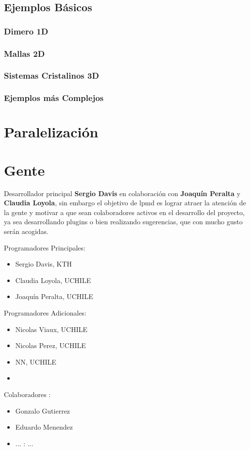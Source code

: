 \documentclass[a4paper,10pt]{scrbook}
\begin{document}
\section{Ejemplos B\'asicos}

\subsection{Dimero 1D}

\subsection{Mallas 2D}

\subsection{Sistemas Cristalinos 3D}

\subsection{Ejemplos m\'as Complejos}

\chapter{Paralelizaci\'on}

\chapter{Gente}
\label{chap:auth}

Desarrollador principal \textbf{Sergio Davis} en colaboraci\'on con \textbf{Joaqu\'in Peralta} y \textbf{Claudia Loyola}, sin embargo el objetivo de lpmd es lograr atraer la atenci\'on de la gente y motivar a que sean colaboradores activos en el desarrollo del proyecto, ya sea desarrollando plugins o bien realizando sugerencias, que con mucho gusto ser\'an acogidas.

Programadores Principales:

\begin{itemize}
 \item Sergio Davis, KTH
 \item Claudia Loyola, UCHILE
 \item Joaqu\'in Peralta, UCHILE
\end{itemize}


Programadores Adicionales:

\begin{itemize}
 \item Nicolas Viaux, UCHILE
 \item Nicolas Perez, UCHILE
 \item NN, UCHILE
 \item 
\end{itemize}


Colaboradores :

\begin{itemize}
 \item Gonzalo Gutierrez
 \item Eduardo Menendez
\end{itemize}


\begin{itemize}
 \item ... : ...
\end{itemize}
\end{document}

